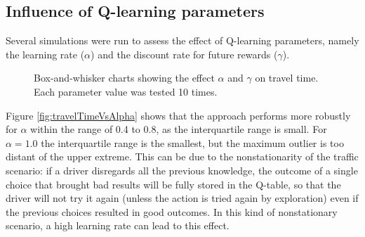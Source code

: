 \documentclass{RITA}
\begin{document}
\subsection{Influence of Q-learning parameters}

Several simulations were run to assess the effect of Q-learning parameters, namely the learning rate ($\alpha$) and the discount rate for future rewards ($\gamma$).

\begin{figure}[ht]
  \centering
  \caption{Box-and-whisker charts showing the effect $\alpha$ and $\gamma$ on travel time. Each parameter value was tested 10 times.}
  \label{fig:qLearningParams}
\end{figure}

Figure \ref{fig:travelTimeVsAlpha} shows that the approach performs more robustly for $\alpha$ within the range of 0.4 to 0.8, as the interquartile range is small. For $\alpha = 1.0$ the interquartile range is the smallest, but the maximum outlier is too distant of the upper extreme. This can be due to the nonstationarity of the traffic scenario: if a driver disregards all the previous knowledge, the outcome of a single choice that brought bad results will be fully stored in the Q-table, so that the driver will not try it again (unless the action is tried again by exploration) even if the previous choices resulted in good outcomes. In this kind of nonstationary scenario, a high learning rate can lead to this effect.
\end{document}
